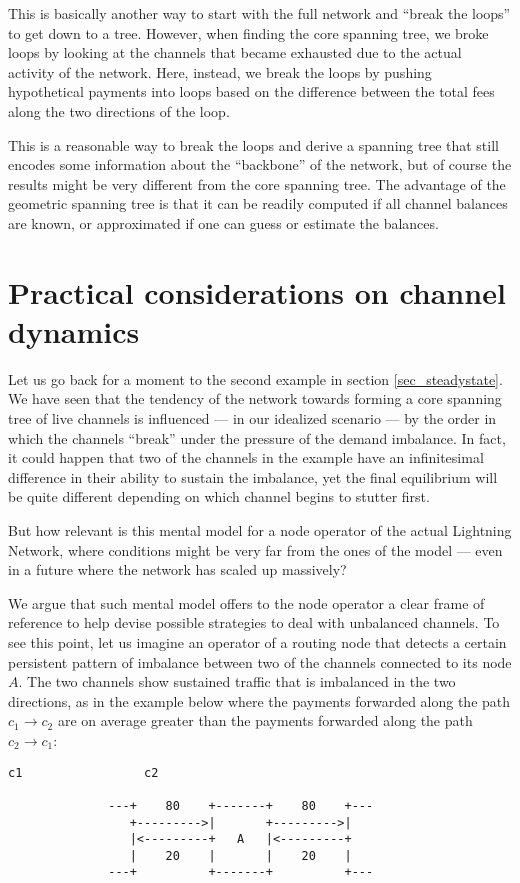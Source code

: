 \documentclass[a4paper]{article}
\begin{document}
This is basically another way to start with the full network and ``break the loops'' to get down to a tree. However, when finding the core spanning tree, we broke loops by looking at the channels that became exhausted due to the actual activity of the network. Here, instead, we break the loops by pushing hypothetical payments into loops based on the difference between the total fees along the two directions of the loop.

This is a reasonable way to break the loops and derive a spanning tree that still encodes some information about the ``backbone'' of the network, but of course the results might be very different from the core spanning tree. The advantage of the geometric spanning tree is that it can be readily computed if all channel balances are known, or approximated if one can guess or estimate the balances.

\section{Practical considerations on channel dynamics}\label{sec_practical}

Let us go back for a moment to the second example in section \ref{sec_steadystate}. We have seen that the tendency of the network towards forming a core spanning tree of live channels is influenced --- in our idealized scenario --- by the order in which the channels ``break'' under the pressure of the demand imbalance. In fact, it could happen that two of the channels in the example have an infinitesimal difference in their ability to sustain the imbalance, yet the final equilibrium will be quite different depending on which channel begins to stutter first.

But how relevant is this mental model for a node operator of the actual Lightning Network, where conditions might be very far from the ones of the model --- even in a future where the network has scaled up massively?

We argue that such mental model offers to the node operator a clear frame of reference to help devise possible strategies to deal with unbalanced channels. To see this point, let us imagine an operator of a routing node that detects a certain persistent pattern of imbalance between two of the channels connected to its node $A$. The two channels show sustained traffic that is imbalanced in the two directions, as in the example below where the payments forwarded along the path $c_1 \rightarrow c_2$ are on average greater than the payments forwarded along the path $c_2 \rightarrow c_1$:
\begin{Verbatim}[samepage=true]
                      c1                 c2

              ---+    80    +-------+    80    +---
                 +--------->|       +--------->|
                 |<---------+   A   |<---------+
                 |    20    |       |    20    |
              ---+          +-------+          +---
\end{Verbatim}
\end{document}
